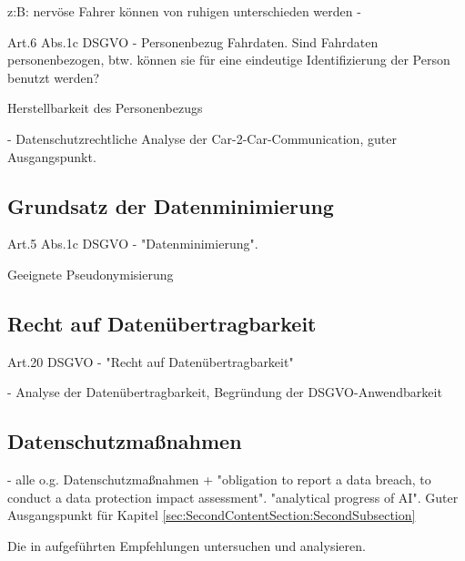 z:B: nervöse Fahrer können von ruhigen unterschieden werden - \cite{Dettki2005}

Art.6 Abs.1c DSGVO - Personenbezug Fahrdaten. Sind Fahrdaten personenbezogen, btw. können sie für eine eindeutige Identifizierung der Person benutzt werden?

Herstellbarkeit des Personenbezugs \cite{Kiometzis2017}

\cite{Weichert2016} - Datenschutzrechtliche Analyse der Car-2-Car-Communication, guter Ausgangspunkt.

\subsection{Grundsatz der Datenminimierung}

Art.5 Abs.1c DSGVO - "Datenminimierung". 

Geeignete Pseudonymisierung

\subsection{Recht auf Datenübertragbarkeit}

Art.20 DSGVO - "Recht auf Datenübertragbarkeit"

\cite{Straub2018} - Analyse der Datenübertragbarkeit, Begründung der DSGVO-Anwendbarkeit

\subsection{Datenschutzmaßnahmen}

\cite{Seewald2018} - alle o.g. Datenschutzmaßnahmen + "obligation to report a data breach, to conduct a data protection impact assessment". "analytical progress of AI". Guter Ausgangspunkt für Kapitel \ref{sec:SecondContentSection:SecondSubsection}

Die in \cite{Kiometzis2017} aufgeführten Empfehlungen untersuchen und analysieren. 

